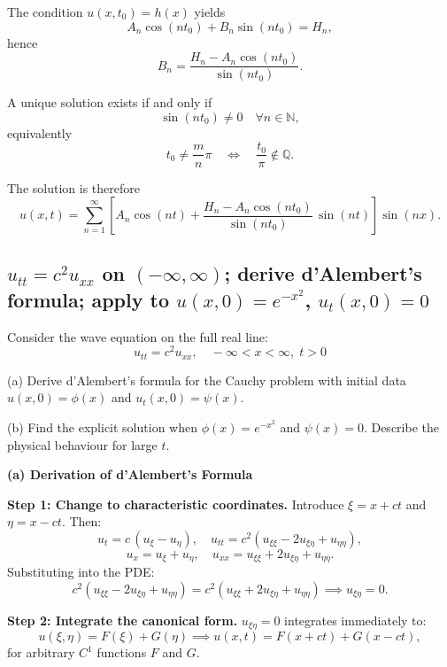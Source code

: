 \documentclass[a4paper,11pt]{article} %
\begin{document}
The condition $u(x,t_0)=h(x)$ yields
\[
A_n\cos(nt_0)+B_n\sin(nt_0)=H_n,
\]
hence
\[
B_n=\frac{H_n-A_n\cos(nt_0)}{\sin(nt_0)}.
\]

A unique solution exists if and only if
\[
\sin(nt_0)\neq0
\quad \forall n\in\mathbb{N},
\]
equivalently
\[
t_0\neq\frac{m}{n}\pi
\quad\Longleftrightarrow\quad
\frac{t_0}{\pi}\notin\mathbb{Q}.
\]

The solution is therefore
\[
u(x,t)=\sum_{n=1}^{\infty}
\left[
A_n\cos(nt)
+
\frac{H_n-A_n\cos(nt_0)}{\sin(nt_0)}\,\sin(nt)
\right]\sin(nx).
\]

\newpage
\subsection{\texorpdfstring{$u_{tt}=c^2 u_{xx}$ on $(-\infty,\infty)$; derive d'Alembert's formula; apply to $u(x,0)=e^{-x^2}$, $u_t(x,0)=0$}{D'Alembert's formula via characteristic coordinates; splitting into two traveling Gaussian pulses}}

\begin{problembox}
Consider the wave equation on the full real line:
$$u_{tt} = c^2 u_{xx}, \quad -\infty < x < \infty, \; t > 0$$

(a) Derive d'Alembert's formula for the Cauchy problem with initial data $u(x,0) = \phi(x)$ and $u_t(x,0) = \psi(x)$.

(b) Find the explicit solution when $\phi(x) = e^{-x^2}$ and $\psi(x) = 0$. Describe the physical behaviour for large $t$.
\end{problembox}

\textbf{(a) Derivation of d'Alembert's Formula}

\textbf{Step 1: Change to characteristic coordinates.}
Introduce $\xi = x + ct$ and $\eta = x - ct$. Then:
\[
    u_t = c\,(u_\xi - u_\eta), \quad
    u_{tt} = c^2(u_{\xi\xi} - 2u_{\xi\eta} + u_{\eta\eta}),
\]
\[
    u_x = u_\xi + u_\eta, \quad
    u_{xx} = u_{\xi\xi} + 2u_{\xi\eta} + u_{\eta\eta}.
\]
Substituting into the PDE:
\[
    c^2(u_{\xi\xi} - 2u_{\xi\eta} + u_{\eta\eta}) = c^2(u_{\xi\xi} + 2u_{\xi\eta} + u_{\eta\eta})
    \implies u_{\xi\eta} = 0.
\]

\textbf{Step 2: Integrate the canonical form.}
$u_{\xi\eta} = 0$ integrates immediately to:
\[
    u(\xi,\eta) = F(\xi) + G(\eta) \implies u(x,t) = F(x+ct) + G(x-ct),
\]
for arbitrary $C^1$ functions $F$ and $G$.
\end{document}
